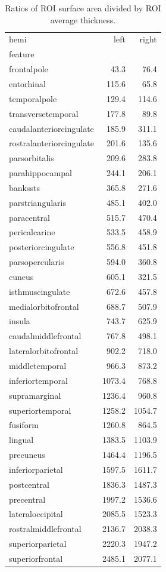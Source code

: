 \documentclass{article}
\begin{document}
\begin{table}[H]
\centering
\begin{tabular}{lrr}
\toprule
hemi & left & right \\
feature &  &  \\
\midrule
frontalpole & 43.3 & 76.4 \\
entorhinal & 115.6 & 65.8 \\
temporalpole & 129.4 & 114.6 \\
transversetemporal & 177.8 & 89.8 \\
caudalanteriorcingulate & 185.9 & 311.1 \\
rostralanteriorcingulate & 201.6 & 135.6 \\
parsorbitalis & 209.6 & 283.8 \\
parahippocampal & 244.1 & 206.1 \\
bankssts & 365.8 & 271.6 \\
parstriangularis & 485.1 & 402.0 \\
paracentral & 515.7 & 470.4 \\
pericalcarine & 533.5 & 458.9 \\
posteriorcingulate & 556.8 & 451.8 \\
parsopercularis & 594.0 & 360.8 \\
cuneus & 605.1 & 321.5 \\
isthmuscingulate & 672.6 & 457.8 \\
medialorbitofrontal & 688.7 & 507.9 \\
insula & 743.7 & 625.9 \\
caudalmiddlefrontal & 767.8 & 498.1 \\
lateralorbitofrontal & 902.2 & 718.0 \\
middletemporal & 966.3 & 873.2 \\
inferiortemporal & 1073.4 & 768.8 \\
supramarginal & 1236.4 & 960.8 \\
superiortemporal & 1258.2 & 1054.7 \\
fusiform & 1260.8 & 864.5 \\
lingual & 1383.5 & 1103.9 \\
precuneus & 1464.4 & 1196.5 \\
inferiorparietal & 1597.5 & 1611.7 \\
postcentral & 1836.3 & 1487.3 \\
precentral & 1997.2 & 1536.6 \\
lateraloccipital & 2085.5 & 1523.3 \\
rostralmiddlefrontal & 2136.7 & 2038.3 \\
superiorparietal & 2220.3 & 1947.2 \\
superiorfrontal & 2485.1 & 2077.1 \\
\bottomrule
\end{tabular}
\footnotesize
\caption{Ratios of ROI surface area divided by ROI average thickness.}\label{tab:sa-ratios}
\normalsize
\end{table}
\end{document}
